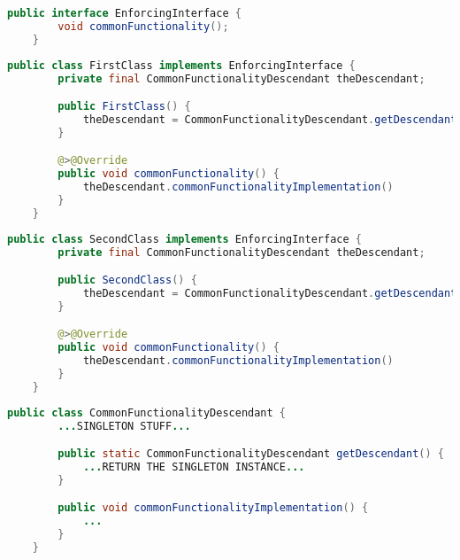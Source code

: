 \enlargethispage{20mm}
\thispagestyle{empty}
\begin{lstlisting}[language=Java, title={Common functionality enforcing interface}]
    public interface EnforcingInterface {
        void commonFunctionality();
    }
\end{lstlisting}
\begin{lstlisting}[language=Java, title={First class to~contain common functionality}]
    public class FirstClass implements EnforcingInterface {
        private final CommonFunctionalityDescendant theDescendant;

        public FirstClass() {
            theDescendant = CommonFunctionalityDescendant.getDescendant();
        }

        @>@Override
        public void commonFunctionality() {
            theDescendant.commonFunctionalityImplementation()
        }
    }
\end{lstlisting}
\begin{lstlisting}[language=Java, title={Second class to~contain common functionality}]
    public class SecondClass implements EnforcingInterface {
        private final CommonFunctionalityDescendant theDescendant;

        public SecondClass() {
            theDescendant = CommonFunctionalityDescendant.getDescendant();
        }

        @>@Override
        public void commonFunctionality() {
            theDescendant.commonFunctionalityImplementation()
        }
    }
\end{lstlisting}
\begin{lstlisting}[language=Java, title={\hyperref[singletondp]{Singleton} descendant containing the~common functionality implementation}]
    public class CommonFunctionalityDescendant {
        ...SINGLETON STUFF...

        public static CommonFunctionalityDescendant getDescendant() {
            ...RETURN THE SINGLETON INSTANCE...
        }

        public void commonFunctionalityImplementation() {
            ...
        }
    }
\end{lstlisting}
